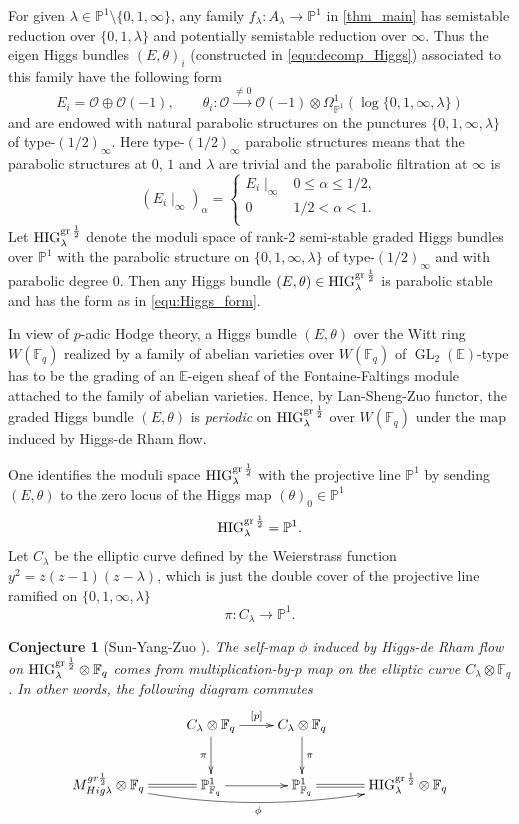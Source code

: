 \documentclass[12pt,twoside]{book}
\theoremstyle{plain}
\newtheorem{conjecture}[conjecture]{Conjecture}
\theoremstyle{definition}
\theoremstyle{remark}
\newcommand{\bP}{{\mathbb P}}
\newcommand{\mO}{{\mathcal O}}
\DeclareMathOperator\GL{GL}
\newcommand{\Fq}{{\mathbb{F}_q}}
\numberwithin{equation}{section}
\def\High{{\mathrm{HIG}^{{\rm gr}\,{1\over 2}}_{\lambda}}}
\def\EK{{\mathbb E}}
\begin{document}
For given $\lambda\in\bP^1\setminus\{0,1,\infty\}$, any family $f_\lambda\colon A_\lambda\rightarrow\bP^1$ in \autoref{thm_main} has semistable reduction over $\{0,1,\lambda\}$ and potentially semistable reduction over $\infty$. Thus the eigen Higgs bundles $(E,\theta)_i$ (constructed in \eqref{equ:decomp_Higgs}) associated to this family  have the following form
\begin{equation} \label{equ:Higgs_form}
E_i=\mO\oplus\mO(-1),\qquad\theta_i\colon\mO\xrightarrow{\neq0} \mO(-1) \otimes\Omega^1_{\bP^1}(\log\{0,1,\infty,\lambda\})
\end{equation}
and are endowed with natural parabolic structures on the punctures $\{0,1,\infty,\lambda\}$ of type-$(1/2)_\infty$.
Here type-$(1/2)_\infty$ parabolic structures means that the parabolic structures at $0$, $1$ and $\lambda$ are trivial and the parabolic filtration at $\infty$ is
\[\left(E_{i}\mid_\infty\right)_\alpha=\left\{\begin{array}{cc}
E_{i}\mid_\infty & 0\leq\alpha\leq1/2,\\
0 & 1/2 <\alpha < 1.\\
\end{array}\right.\]
Let $\High$ denote the moduli space of rank-2 semi-stable graded Higgs bundles over $\bP^1$ with the parabolic structure on $\{0,1,\infty,\lambda\}$ of type-$(1/2)_\infty$ and with parabolic degree $0$. Then any Higgs bundle $(E,\theta)\in\High$ is parabolic stable and has the form as in \eqref{equ:Higgs_form}.

In view of $p$-adic Hodge theory, a Higgs bundle $(E,\theta)$ over the Witt ring $W(\Fq)$ realized by a family of abelian varieties over $W(\Fq)$ of $\GL_2(\EK)$-type has to be the grading of an $\EK$-eigen sheaf of the Fontaine-Faltings module
attached to the family of abelian varieties. Hence, by Lan-Sheng-Zuo functor, the graded Higgs bundle $(E,\theta)$ is \emph{periodic} on $\High$ over $W(\Fq)$ under the map induced by Higgs-de Rham flow.

One identifies the moduli space $\High$ with the projective line $\bP^1$ by sending $(E,\theta)$ to the zero locus of the Higgs map $(\theta)_0\in\bP^1$
\[\High= \bP^1.\]
Let $C_{\lambda}$ be the elliptic curve defined by the Weierstrass function $y^2=z(z-1)(z- \lambda)$, which is just the double cover of the projective line ramified on $\{0,1,\infty,\lambda\}$
\[\pi\colon C_\lambda\to\bP^1.\]
\begin{conjecture} [Sun-Yang-Zuo \cite{SYZ22}] \label{conj:SYZ}
The self-map $\phi$ induced by Higgs-de Rham flow on ${\High}\otimes {\Fq}$ comes from multiplication-by-$p$ map on the elliptic curve $C_\lambda\otimes\Fq$. In other words, the following diagram commutes
\[\xymatrix{
& C_\lambda\otimes {\Fq} \ar[d]_{\pi} \ar[r]^{[p]} & C_\lambda\otimes {\Fq} \ar[d]^{\pi} & \\
M_{Hig\lambda}^{gr {1\over 2}} \otimes {\Fq}\ar@/_12pt/[rrr]_{\phi} \ar@{=}[r] & \bP^1_{\Fq} \ar[r] & \bP^1_{\Fq} \ar@{=}[r] & \High\otimes {\Fq} \\
}\]
\end{conjecture}
\end{document}
